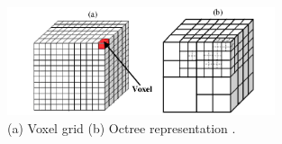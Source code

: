 










\begin{figure}[!ht]
        \centering
        \includegraphics[width=0.7\textwidth]{images/voxelgridvsoctree.png}
        \caption{(a) Voxel grid (b) Octree representation \cite{saaidi2014multi}.
        }
        \label{fig:octree-vs-voxel}
\end{figure}


